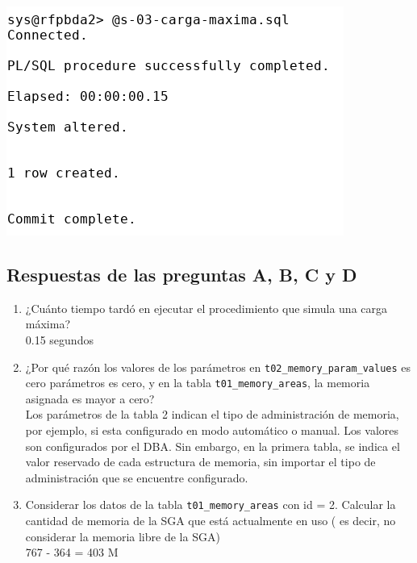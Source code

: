 \documentclass{article}
\begin{document}
\includegraphics[width=0.4\linewidth]{c1}

\subsection*{Respuestas de las preguntas A, B, C y D}

\begin{enumerate}[label=\Alph*.]
  \item ¿Cuánto tiempo tardó en ejecutar el procedimiento que simula una 
    carga máxima? \\[3mm]
    0.15 segundos

  \item ¿Por qué razón los valores de los parámetros en 
    \texttt{t02\_memory\_param\_values} es cero parámetros es cero, y en la 
    tabla \texttt{t01\_memory\_areas}, la memoria asignada es mayor a cero?
    \\[3mm]
    Los parámetros de la tabla 2 indican el tipo de administración de memoria,
    por ejemplo, si esta configurado en modo automático o manual. Los valores
    son configurados por el DBA. Sin embargo, en la primera tabla, se indica el
    valor reservado de cada estructura de memoria, sin importar el tipo de
    administración que se encuentre configurado.

  \item Considerar los datos de la tabla \texttt{t01\_memory\_areas} con 
    id = 2. Calcular la cantidad de memoria de la SGA que está actualmente 
    en uso ( es decir, no considerar la memoria libre de la SGA)\\[3mm]
    767 - 364 = 403 M


\end{enumerate}
\end{document}
